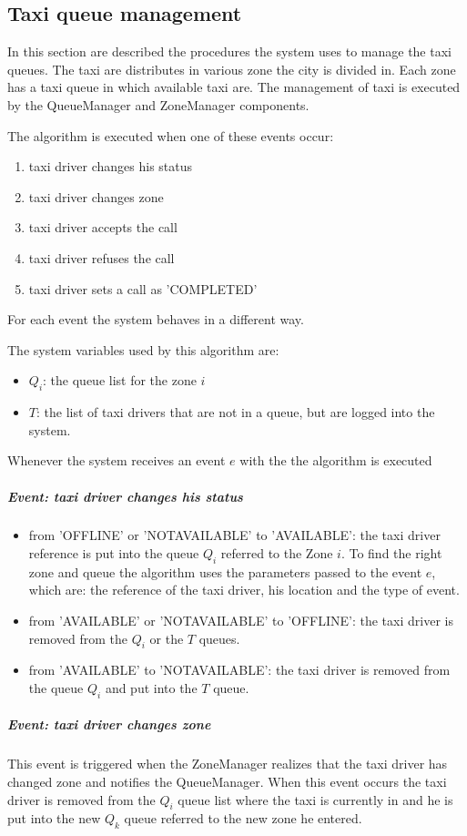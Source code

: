 \subsection{Taxi queue management}
In this section are described the procedures the system uses to manage the taxi queues.
The taxi are distributes in various zone the city is divided in. Each zone has a taxi queue in which available taxi are.
The management of taxi is executed by the QueueManager and ZoneManager components.

The algorithm is executed when one of these events occur:
\begin{enumerate}
    \item taxi driver changes his status
    \item taxi driver changes zone 
    \item taxi driver accepts the call 
    \item taxi driver refuses the call 
    \item taxi driver sets a call as 'COMPLETED' 
\end{enumerate}
For each event the system behaves in a different way.

The system variables used by this algorithm are:
\begin{itemize}
    \item $Q_i$: the queue list for the zone $i$
    \item $T$: the list of taxi drivers that are not in a queue, but are logged into the system.
\end{itemize}

Whenever the system receives an event $e$ with the  the algorithm is executed
\subparagraph{Event: taxi driver changes his status}
\begin{itemize}
    \item from 'OFFLINE' or 'NOTAVAILABLE' to 'AVAILABLE': the taxi driver reference is put into the queue $Q_i$ referred to the Zone $i$. To find the right zone and queue the algorithm uses the parameters passed to the event $e$, which are: the reference of the taxi driver, his location and the type of event.
    \item from 'AVAILABLE' or 'NOTAVAILABLE' to 'OFFLINE': the taxi driver is removed from the $Q_i$ or the $T$ queues.
    \item from 'AVAILABLE' to 'NOTAVAILABLE': the taxi driver is removed from the queue $Q_i$ and put into the $T$ queue.
\end{itemize}

\subparagraph{Event: taxi driver changes zone}
This event is triggered when the ZoneManager realizes that the taxi driver has changed zone and notifies the QueueManager.
When this event occurs the taxi driver is removed from the $Q_i$ queue list where the taxi is currently in and he is put into the new $Q_k$ queue referred to the new zone he entered.

